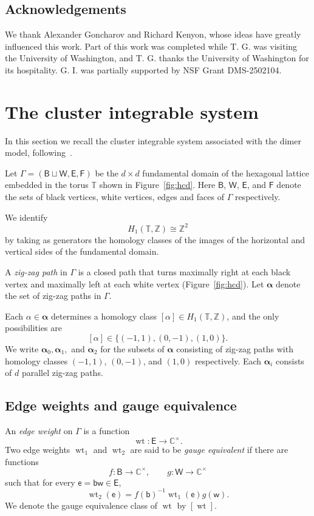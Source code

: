 \documentclass[dvipsnames,11pt]{article}
\theoremstyle{definition}
\newcommand{\wt}{\operatorname{wt}}
\newcommand{\Z}{{\mathbb Z}}
\newcommand{\C}{{\mathbb C}}
\newcommand{\T}{{\mathbb T}}
\def\B{\mathsf B}
\def\W{\mathsf W}
\def\w{\mathsf w}
\def\b{\mathsf b}
\def\e{\mathsf e}
\def\E{\mathsf E}
\def\F{\mathsf F}
\def\graph{\Gamma}
\def\zz{\bm \alpha}
\begin{document}
\subsection*{Acknowledgements}
We thank Alexander Goncharov and Richard Kenyon, whose ideas have greatly influenced this work. Part of this work was completed while T. G. was visiting the University of Washington, and T. G. thanks the University of Washington for its hospitality. G. I. was partially supported by NSF Grant DMS-2502104.

\section{The cluster integrable system}

In this section we recall the cluster integrable system associated with the dimer model, following~\cite{GK13}. 

Let $\graph=(\B\sqcup\W,\E,\F)$ be the $d\times d$ fundamental domain of the hexagonal lattice embedded in the torus $\T$ shown in Figure~\ref{fig:hcd}. Here $\B$, $\W$, $\E$, and $\F$ denote the sets of black vertices, white vertices, edges and faces of $\graph$ respectively.


We identify
\[
H_1(\T,\Z)\cong \Z^2
\]
by taking as generators the homology classes of the images of the horizontal and vertical sides of the fundamental domain. 


A \emph{zig-zag path} in $\graph$ is a closed path that turns maximally right at each black vertex and maximally left at each white vertex (Figure~\ref{fig:hcd}). Let $\zz$ denote the set of zig-zag paths in $\graph$. 

Each $\alpha\in\zz$ determines a homology class $[\alpha]\in H_1(\T,\Z)$, and the only possibilities are
\[
[\alpha]\in\{(-1,1),(0,-1),(1,0)\}.
\]
We write $\zz_0,\zz_1,$ and $\zz_2$ for the subsets of $\zz$ consisting of zig-zag paths with homology classes $(-1,1)$, $(0,-1)$, and $(1,0)$ respectively. Each $\zz_i$ consists of $d$ parallel zig-zag paths.


\subsection{Edge weights and gauge equivalence}

An \emph{edge weight} on $\Gamma$ is a function 
\[
\wt: \E \rightarrow \C^\times.
\]
Two edge weights $\wt_1$ and $\wt_2$ are said to be \emph{gauge equivalent} if there are functions 
\[
 f: \B \rightarrow \C^\times, \qquad g: \W \rightarrow \C^\times
\]
such that for every $\e=\b\w \in \E$,
\[
\wt_2(\e) = f(\b)^{-1} \wt_1(\e) g(\w). 
\]
We denote the gauge equivalence class of $\wt$ by $[\wt]$.
\end{document}
